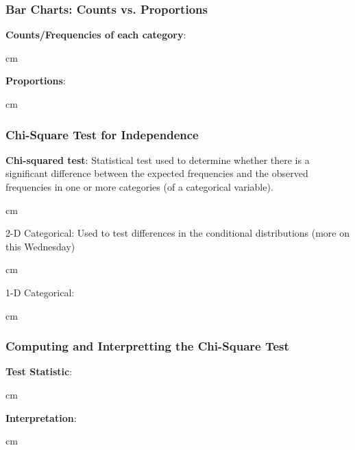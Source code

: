 \documentclass{beamer} %
\begin{document}
\begin{frame}\frametitle{Bar Charts:  Counts vs. Proportions}
	\small
	
	\textbf{Counts/Frequencies of each category}:  %
	
	
	 cm
	
	\textbf{Proportions}:  %
	
	
	
	
	 cm
	
\end{frame}



\begin{frame}\frametitle{Chi-Square Test for Independence}
	\small
	
	\textbf{Chi-squared test}:  Statistical test used to determine whether there is a significant difference between the expected frequencies and the observed frequencies in one or more categories (of a categorical variable).
	
	 cm
	
	2-D Categorical:  Used to test differences in the conditional distributions (more on this Wednesday)
	
	 cm
	
	1-D Categorical:
	
	 cm
	
\end{frame}



\begin{frame}\frametitle{Computing and Interpretting the Chi-Square Test}
	\small
	
	\textbf{Test Statistic}:  
	
	 cm
	
	\textbf{Interpretation}:  
	
	 cm
	
\end{frame}
\end{document}
